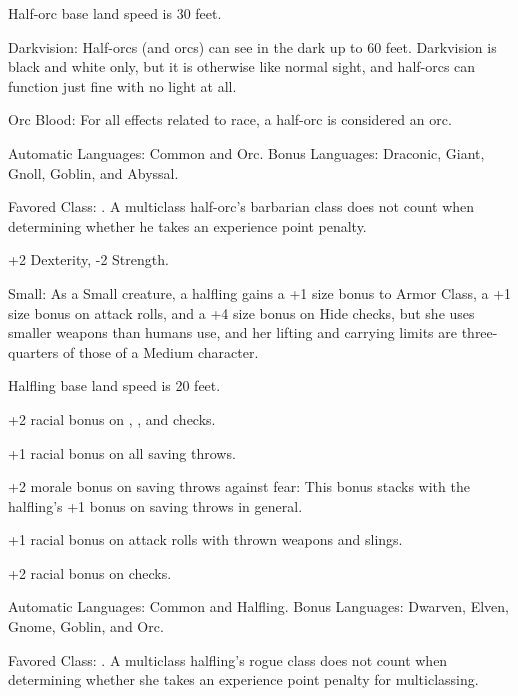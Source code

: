 Half-orc base land speed is 30 feet.

Darkvision: Half-orcs (and orcs) can see in the dark up to 60 feet. Darkvision 
is black and white only, but it is otherwise like normal sight, and half-orcs can 
function just fine with no light at all.

Orc Blood: For all effects related to race, a half-orc is considered an orc.

Automatic Languages: Common and Orc. Bonus Languages: Draconic, Giant, Gnoll, Goblin, 
and Abyssal.

Favored Class: . A multiclass half-orc's barbarian class does not count 
when determining whether he takes an experience point penalty.


+2 Dexterity, -2 Strength.

Small: As a Small creature, a halfling gains a +1 size bonus to Armor Class, a 
+1 size bonus on attack rolls, and a +4 size bonus on Hide checks, but she uses 
smaller weapons than humans use, and her lifting and carrying limits are three-quarters 
of those of a Medium character.

Halfling base land speed is 20 feet.

+2 racial bonus on , , and  checks.

+1 racial bonus on all saving throws.

+2 morale bonus on saving throws against fear: This bonus stacks with the halfling's 
+1 bonus on saving throws in general.

+1 racial bonus on attack rolls with thrown weapons and slings.

+2 racial bonus on  checks.

Automatic Languages: Common and Halfling. Bonus Languages: Dwarven, Elven, Gnome, 
Goblin, and Orc.

Favored Class: . A multiclass halfling's rogue class does not count when determining 
whether she takes an experience point penalty for multiclassing.
